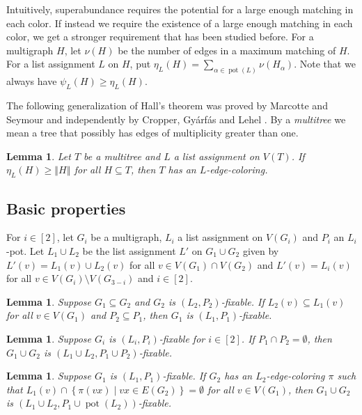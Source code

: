 \documentclass[12pt]{article}
\theoremstyle{plain}
\newtheorem{lem}[thm]{Lemma}
\theoremstyle{definition}
\theoremstyle{remark}
\newcommand{\setbs}[2]{\left\{ #1 \mid #2 \right\}}
\newcommand{\size}[1]{\left\Vert#1\right\Vert}
\newcommand{\irange}[1]{\left[#1\right]}
\newcommand{\pot}{\operatorname{pot}}
\begin{document}
Intuitively, superabundance requires the potential for a large enough matching in each color. If instead we require the existence of a large enough matching in each color, we get a stronger requirement that has been studied before. For a multigraph $H$, let $\nu(H)$ be the number of edges in a maximum matching of $H$. 
For a list assignment $L$ on $H$, put $\eta_L(H) = \sum_{\alpha \in \pot(L)} \nu(H_\alpha)$.  Note that we always have $\psi_L(H) \ge \eta_L(H)$.

The following generalization of Hall's theorem was proved by Marcotte and Seymour \cite{marcotte1990extending} and independently by Cropper, Gy{\'a}rf{\'a}s and Lehel \cite{cropper2003edge}.  By a \emph{multitree} we mean a tree that possibly has edges of multiplicity greater than one.

\begin{lem}\label{MultiTreeHall}
Let $T$ be a multitree and $L$ a list assignment on $V(T)$.  If $\eta_L(H) \ge \size{H}$ for all $H \subseteq T$, then $T$ has an $L$-edge-coloring.
\end{lem}

\subsection{Basic properties}
For $i \in \irange{2}$, let $G_i$ be a multigraph, $L_i$ a list assignment on $V(G_i)$ and $P_i$ an $L_i$-pot.  Let $L_1 \cup L_2$ be the list assignment $L'$ on $G_1 \cup G_2$ given by $L'(v) = L_1(v) \cup L_2(v)$ for all $v \in V(G_1) \cap V(G_2)$ and $L'(v) = L_i(v)$ for all $v \in V(G_i) \setminus V(G_{3-i})$ and $i \in \irange{2}$.

\begin{lem}
Suppose $G_1 \subseteq G_2$ and $G_2$ is $(L_2, P_2)$-fixable.  If $L_2(v) \subseteq L_1(v)$ for all $v \in V(G_1)$ and $P_2 \subseteq P_1$, then $G_1$ is $(L_1, P_1)$-fixable.
\end{lem}

\begin{lem}
Suppose $G_i$ is $(L_i, P_i)$-fixable for $i \in \irange{2}$.  If $P_1 \cap P_2 = \emptyset$, then $G_1 \cup G_2$ is $(L_1 \cup L_2, P_1 \cup P_2)$-fixable.
\end{lem}
\begin{lem}
Suppose $G_1$ is $(L_1, P_1)$-fixable.  If $G_2$ has an $L_2$-edge-coloring $\pi$ such that $L_1(v) \cap \setbs{\pi(vx)}{vx \in E(G_2)} = \emptyset$ for all $v \in V(G_1)$, then $G_1 \cup G_2$ is $(L_1 \cup L_2, P_1 \cup \pot(L_2))$-fixable.
\end{lem}
\end{document}
